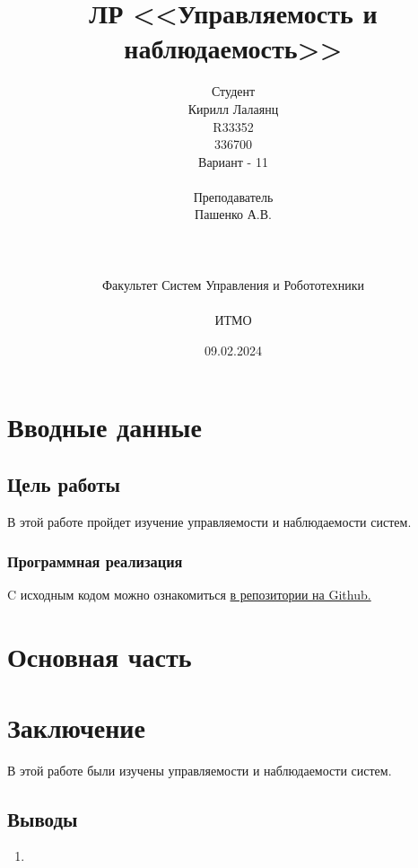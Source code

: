 \documentclass[16pt]{article}
\title{ЛР \textnumero 7 <<Управляемость и наблюдаемость>>}
\author{
Студент \\
Кирилл Лалаянц\\
R33352\\
336700\\
Вариант - 11\\
\\
Преподаватель\\
Пашенко А.В. \\
\\
\\
\\
Факультет Систем Управления и Робототехники\\
\\
ИТМО\\
}
\date{09.02.2024}
\begin{document}
\maketitle
\newpage
\tableofcontents
\thispagestyle{empty}

\newpage
\setcounter{page}{1}
\section{Вводные данные}
\subsection{Цель работы}
В этой работе пройдет изучение управляемости и наблюдаемости систем.


\subsubsection{Программная реализация}
C исходным кодом можно ознакомиться \href{https://github.com/lalayants/control-theory-itmo-2023-2024}{в репозитории на Github.}
\newpage
\section{Основная часть}


\newpage


\newpage



\newpage


\newpage
\section{Заключение}
В этой работе были изучены управляемости и наблюдаемости систем.
\subsection{Выводы}
\begin{enumerate}
   \item 
\end{enumerate}
\end{document}
